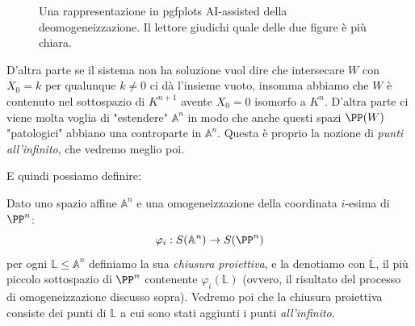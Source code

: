 \documentclass[11pt]{scrartcl}
\renewcommand{\AA}{\mathbb{A}}
\newcommand{\LL}{\mathbb{L}}
\begin{document}
\begin{description}
\begin{figure}[h]
\begin{center}
   	 		\end{center}
   	 		\caption{Una rappresentazione in pgfplots AI-assisted della deomogeneizzazione. Il lettore giudichi quale delle due figure è più chiara.}
   	 		\label{fig:figure2}
   	 	\end{figure}
   	 	D'altra parte se il sistema non ha soluzione vuol dire che intersecare $W$ con $X_0=k$ per qualunque $k\ne 0$ ci dà l'insieme vuoto, insomma abbiamo che $W$ è contenuto nel sottospazio di $K^{n+1}$ avente $X_0=0$ isomorfo a $K^n$. D'altra parte ci viene molta voglia di "estendere" $\AA^n$ in modo che anche questi spazi $\PP(W)$ "patologici" abbiano una controparte in $\AA^n$. Questa è proprio la nozione di \textit{punti all'infinito}, che vedremo meglio poi.
   	 \end{description}
   	 E quindi possiamo definire:
   	 \begin{definition}
   	 	Dato uno spazio affine $\AA^n$ e una omogeneizzazione della coordinata $i$-esima di $\PP^n$:
   	 	$$\varphi_i:S(\AA^n)\to S(\PP^n)$$
   	 	per ogni $\LL\le \AA^n$ definiamo la sua \textit{chiusura proiettiva}, e la denotiamo con $\overline{\LL}$, il più piccolo sottospazio di $\PP^n$ contenente $\varphi_i(\LL)$ (ovvero, il risultato del processo di omogeneizzazione discusso sopra). Vedremo poi che la chiusura proiettiva consiste dei punti di $\LL$ a cui sono stati aggiunti i punti \textit{all'infinito}.
   	 \end{definition}
\end{document}
